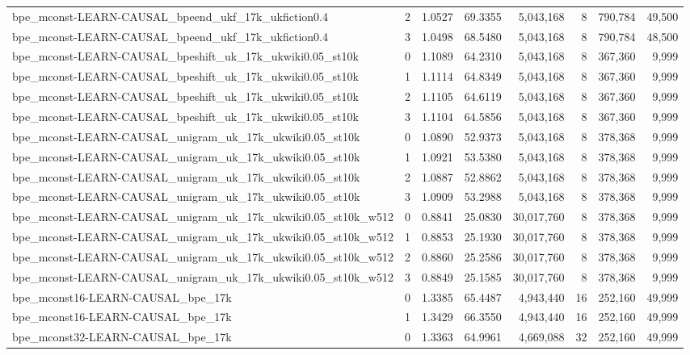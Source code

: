 \begin{tabular}{lrrrrrrr}
bpe\_mconst-LEARN-CAUSAL\_bpeend\_ukf\_17k\_ukfiction0.4 & 2 & 1.0527 & 69.3355 & 5,043,168 & 8 & 790,784 & 49,500 \\
bpe\_mconst-LEARN-CAUSAL\_bpeend\_ukf\_17k\_ukfiction0.4 & 3 & 1.0498 & 68.5480 & 5,043,168 & 8 & 790,784 & 48,500 \\
bpe\_mconst-LEARN-CAUSAL\_bpeshift\_uk\_17k\_ukwiki0.05\_st10k & 0 & 1.1089 & 64.2310 & 5,043,168 & 8 & 367,360 & 9,999 \\
bpe\_mconst-LEARN-CAUSAL\_bpeshift\_uk\_17k\_ukwiki0.05\_st10k & 1 & 1.1114 & 64.8349 & 5,043,168 & 8 & 367,360 & 9,999 \\
bpe\_mconst-LEARN-CAUSAL\_bpeshift\_uk\_17k\_ukwiki0.05\_st10k & 2 & 1.1105 & 64.6119 & 5,043,168 & 8 & 367,360 & 9,999 \\
bpe\_mconst-LEARN-CAUSAL\_bpeshift\_uk\_17k\_ukwiki0.05\_st10k & 3 & 1.1104 & 64.5856 & 5,043,168 & 8 & 367,360 & 9,999 \\
bpe\_mconst-LEARN-CAUSAL\_unigram\_uk\_17k\_ukwiki0.05\_st10k & 0 & 1.0890 & 52.9373 & 5,043,168 & 8 & 378,368 & 9,999 \\
bpe\_mconst-LEARN-CAUSAL\_unigram\_uk\_17k\_ukwiki0.05\_st10k & 1 & 1.0921 & 53.5380 & 5,043,168 & 8 & 378,368 & 9,999 \\
bpe\_mconst-LEARN-CAUSAL\_unigram\_uk\_17k\_ukwiki0.05\_st10k & 2 & 1.0887 & 52.8862 & 5,043,168 & 8 & 378,368 & 9,999 \\
bpe\_mconst-LEARN-CAUSAL\_unigram\_uk\_17k\_ukwiki0.05\_st10k & 3 & 1.0909 & 53.2988 & 5,043,168 & 8 & 378,368 & 9,999 \\
bpe\_mconst-LEARN-CAUSAL\_unigram\_uk\_17k\_ukwiki0.05\_st10k\_w512 & 0 & 0.8841 & 25.0830 & 30,017,760 & 8 & 378,368 & 9,999 \\
bpe\_mconst-LEARN-CAUSAL\_unigram\_uk\_17k\_ukwiki0.05\_st10k\_w512 & 1 & 0.8853 & 25.1930 & 30,017,760 & 8 & 378,368 & 9,999 \\
bpe\_mconst-LEARN-CAUSAL\_unigram\_uk\_17k\_ukwiki0.05\_st10k\_w512 & 2 & 0.8860 & 25.2586 & 30,017,760 & 8 & 378,368 & 9,999 \\
bpe\_mconst-LEARN-CAUSAL\_unigram\_uk\_17k\_ukwiki0.05\_st10k\_w512 & 3 & 0.8849 & 25.1585 & 30,017,760 & 8 & 378,368 & 9,999 \\
bpe\_mconst16-LEARN-CAUSAL\_bpe\_17k & 0 & 1.3385 & 65.4487 & 4,943,440 & 16 & 252,160 & 49,999 \\
bpe\_mconst16-LEARN-CAUSAL\_bpe\_17k & 1 & 1.3429 & 66.3550 & 4,943,440 & 16 & 252,160 & 49,999 \\
bpe\_mconst32-LEARN-CAUSAL\_bpe\_17k & 0 & 1.3363 & 64.9961 & 4,669,088 & 32 & 252,160 & 49,999 \\

\end{tabular}
